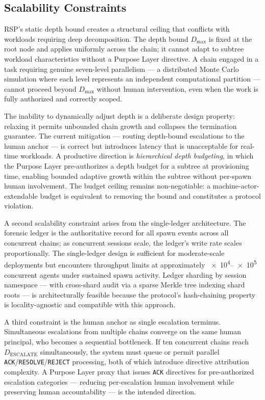 \subsection{Scalability Constraints}
\label{sec:rs-scalability}

RSP's static depth bound creates a structural ceiling that conflicts with workloads requiring deep decomposition. The depth bound $D_{\max}$ is fixed at the root node and applies uniformly across the chain; it cannot adapt to subtree workload characteristics without a Purpose Layer directive. A chain engaged in a task requiring genuine seven-level parallelism --- a distributed Monte Carlo simulation where each level represents an independent computational partition --- cannot proceed beyond $D_{\max}$ without human intervention, even when the work is fully authorized and correctly scoped.

The inability to dynamically adjust depth is a deliberate design property: relaxing it permits unbounded chain growth and collapses the termination guarantee. The current mitigation --- routing depth-bound escalations to the human anchor --- is correct but introduces latency that is unacceptable for real-time workloads. A productive direction is \emph{hierarchical depth budgeting}, in which the Purpose Layer pre-authorizes a depth budget for a subtree at provisioning time, enabling bounded adaptive growth within the subtree without per-spawn human involvement. The budget ceiling remains non-negotiable: a machine-actor-extendable budget is equivalent to removing the bound and constitutes a protocol violation.

A second scalability constraint arises from the single-ledger architecture. The forensic ledger is the authoritative record for all spawn events across all concurrent chains; as concurrent sessions scale, the ledger's write rate scales proportionally. The single-ledger design is sufficient for moderate-scale deployments but encounters throughput limits at approximately \numrange{e4}{e5} concurrent agents under sustained spawn activity. Ledger sharding by session namespace --- with cross-shard audit via a sparse Merkle tree indexing shard roots --- is architecturally feasible because the protocol's hash-chaining property is locality-agnostic and compatible with this approach.

A third constraint is the human anchor as single escalation terminus. Simultaneous escalations from multiple chains converge on the same human principal, who becomes a sequential bottleneck. If ten concurrent chains reach $D_{\text{ESCALATE}}$ simultaneously, the system must queue or permit parallel \texttt{ACK}/\texttt{RESOLVE}/\texttt{REJECT} processing, both of which introduce directive attribution complexity. A Purpose Layer proxy that issues \texttt{ACK} directives for pre-authorized escalation categories --- reducing per-escalation human involvement while preserving human accountability --- is the intended direction.

